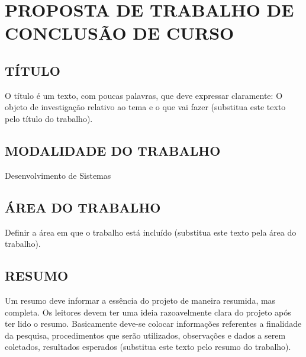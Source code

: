 
\chapter{PROPOSTA DE TRABALHO DE CONCLUSÃO DE CURSO}
\label{chap:proposta}

\section{TÍTULO}
\label{sec:titulo}
O título é um texto, com poucas palavras, que deve expressar claramente: O objeto de investigação relativo ao tema e o que vai fazer (substitua este texto pelo título do trabalho).

\section{MODALIDADE DO TRABALHO}
\label{sec:modalidade}
Desenvolvimento de Sistemas

\section{ÁREA DO TRABALHO}
\label{sec:area}
Definir a área em que o trabalho está incluído (substitua este texto pela área do trabalho).

\section{RESUMO}
\label{sec:resumo}
Um resumo deve informar a essência do projeto de maneira resumida, mas completa. Os leitores devem ter uma ideia razoavelmente clara do projeto após ter lido o resumo. Basicamente deve-se colocar informações referentes a finalidade da pesquisa, procedimentos que serão utilizados, observações e dados a serem coletados, resultados esperados (substitua este texto pelo resumo do trabalho).

